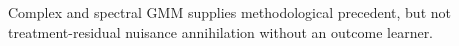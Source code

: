 Complex and spectral GMM supplies methodological precedent, but not treatment-residual nuisance annihilation without an outcome learner.